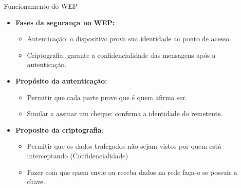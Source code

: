 \begin{frame}{Funcionamento do WEP}
    \begin{itemize}
        \item \textbf{Fases da segurança no WEP:}
              \begin{itemize}
                  \item Autenticação: o dispositivo prova sua identidade ao ponto de acesso.
                  \item Criptografia: garante a confidencialidade das mensagens após a autenticação.
              \end{itemize}
    \end{itemize}
    \begin{itemize}
        \item \textbf{Propósito da autenticação:}
              \begin{itemize}
                  \item Permitir que cada parte prove que é quem afirma ser.
                  \item Similar a assinar um cheque: confirma a identidade do remetente.
              \end{itemize}
    \end{itemize}

    \begin{itemize}
        \item \textbf{Proposito da criptografia}:
              \begin{itemize}
                  \item Permitir que os dados trafegados não sejam vistos por quem está interceptando (Confidencialidade)
                  \item Fazer com que quem envie ou receba dados na rede faça-o se possuir a chave.
              \end{itemize}
    \end{itemize}


\end{frame}





